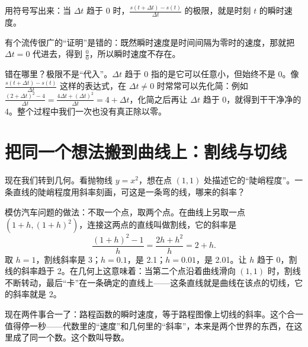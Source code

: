 用符号写出来：当 $\Delta t$ 趋于 0 时，$\frac{s(t+\Delta t)-s(t)}{\Delta t}$ 的极限，就是时刻 $t$ 的瞬时速度。

\begin{fanli}
有个流传很广的“证明”是错的：既然瞬时速度是时间间隔为零时的速度，那就把 $\Delta t=0$ 代进去，得到 $\frac{0}{0}$，所以瞬时速度不存在。

错在哪里？极限不是“代入”。$\Delta t$ 趋于 0 指的是它可以任意小，但始终不是 0。像 $\frac{s(t+\Delta t)-s(t)}{\Delta t}$ 这样的表达式，在 $\Delta t\neq 0$ 时常常可以先化简：例如 $\frac{(2+\Delta t)^2-4}{\Delta t}=\frac{4\Delta t+(\Delta t)^2}{\Delta t}=4+\Delta t$，化简之后再让 $\Delta t$ 趋于 0，就得到干干净净的 4。整个过程中我们一次也没有真正除以零。
\end{fanli}

\section{把同一个想法搬到曲线上：割线与切线}

现在我们转到几何。看抛物线 $y=x^2$，想在点 $(1,1)$ 处描述它的“陡峭程度”。一条直线的陡峭程度用斜率刻画，可这是一条弯的线，哪来的斜率？

模仿汽车问题的做法：不取一个点，取两个点。在曲线上另取一点 $(1+h,(1+h)^2)$，连接这两点的直线叫做割线，它的斜率是
\[
\frac{(1+h)^2-1}{h}=\frac{2h+h^2}{h}=2+h.
\]
取 $h=1$，割线斜率是 3；$h=0.1$，是 2.1；$h=0.01$，是 2.01。让 $h$ 趋于 0，割线的斜率趋于 2。在几何上这意味着：当第二个点沿着曲线滑向 $(1,1)$ 时，割线不断转动，最后“卡”在一条确定的直线上——这条直线就是曲线在该点的切线，它的斜率就是 2。

\begin{center}
\end{center}

现在两件事合一了：路程函数的瞬时速度，等于路程图像上切线的斜率。这个合一值得停一秒——代数里的“速度”和几何里的“斜率”，本来是两个世界的东西，在这里成了同一个数。这个数叫导数。

